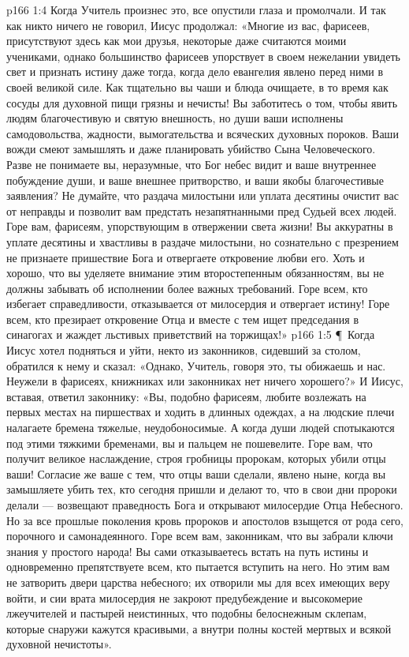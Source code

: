 \vs p166 1:4 Когда Учитель произнес это, все опустили глаза и промолчали. И так как никто ничего не говорил, Иисус продолжал: «Многие из вас, фарисеев, присутствуют здесь как мои друзья, некоторые даже считаются моими учениками, однако большинство фарисеев упорствует в своем нежелании увидеть свет и признать истину даже тогда, когда дело евангелия явлено перед ними в своей великой силе. Как тщательно вы чаши и блюда очищаете, в то время как сосуды для духовной пищи грязны и нечисты! Вы заботитесь о том, чтобы явить людям благочестивую и святую внешность, но души ваши исполнены самодовольства, жадности, вымогательства и всяческих духовных пороков. Ваши вожди смеют замышлять и даже планировать убийство Сына Человеческого. Разве не понимаете вы, неразумные, что Бог небес видит и ваше внутреннее побуждение души, и ваше внешнее притворство, и ваши якобы благочестивые заявления? Не думайте, что раздача милостыни или уплата десятины очистит вас от неправды и позволит вам предстать незапятнанными пред Судьей всех людей. Горе вам, фарисеям, упорствующим в отвержении света жизни! Вы аккуратны в уплате десятины и хвастливы в раздаче милостыни, но сознательно с презрением не признаете пришествие Бога и отвергаете откровение любви его. Хоть и хорошо, что вы уделяете внимание этим второстепенным обязанностям, вы не должны забывать об исполнении более важных требований. Горе всем, кто избегает справедливости, отказывается от милосердия и отвергает истину! Горе всем, кто презирает откровение Отца и вместе с тем ищет председания в синагогах и жаждет льстивых приветствий на торжищах!»
\vs p166 1:5 \P\ Когда Иисус хотел подняться и уйти, некто из законников, сидевший за столом, обратился к нему и сказал: «Однако, Учитель, говоря это, ты обижаешь и нас. Неужели в фарисеях, книжниках или законниках нет ничего хорошего?» И Иисус, вставая, ответил законнику: «Вы, подобно фарисеям, любите возлежать на первых местах на пиршествах и ходить в длинных одеждах, а на людские плечи налагаете бремена тяжелые, неудобоносимые. А когда души людей спотыкаются под этими тяжкими бременами, вы и пальцем не пошевелите. Горе вам, что получит великое наслаждение, строя гробницы пророкам, которых убили отцы ваши! Согласие же ваше с тем, что отцы ваши сделали, явлено ныне, когда вы замышляете убить тех, кто сегодня пришли и делают то, что в свои дни пророки делали --- возвещают праведность Бога и открывают милосердие Отца Небесного. Но за все прошлые поколения кровь пророков и апостолов взыщется от рода сего, порочного и самонадеянного. Горе всем вам, законникам, что вы забрали ключи знания у простого народа! Вы сами отказываетесь встать на путь истины и одновременно препятствуете всем, кто пытается вступить на него. Но этим вам не затворить двери царства небесного; их отворили мы для всех имеющих веру войти, и сии врата милосердия не закроют предубеждение и высокомерие лжеучителей и пастырей неистинных, что подобны белоснежным склепам, которые снаружи кажутся красивыми, а внутри полны костей мертвых и всякой духовной нечистоты».
